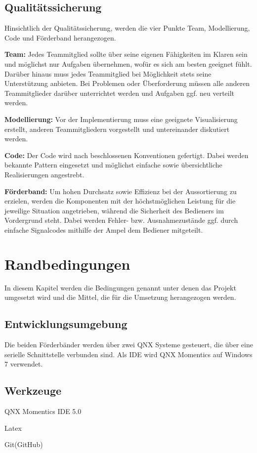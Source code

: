 \documentclass[a4paper, 11pt]{article}
\begin{document}
\subsection{Qualitätssicherung}
Hinsichtlich der Qualitätssicherung, werden die vier Punkte Team, Modellierung, Code und Förderband herangezogen.
\medskip
\begin{compactenum}[1.]
\item \textbf{Team:} Jedes Teammitglied sollte über seine eigenen Fähigkeiten im Klaren sein und möglichst nur Aufgaben übernehmen, wofür es sich am besten geeignet fühlt. Darüber hinaus muss jedes Teammitglied bei Möglichkeit stets seine Unterstützung anbieten. Bei Problemen oder Überforderung müssen alle anderen Teammitglieder darüber unterrichtet werden und Aufgaben ggf. neu verteilt werden.
\medskip
\item \textbf{Modellierung:} Vor der Implementierung muss eine geeignete Visualisierung erstellt, anderen Teammitgliedern vorgestellt und untereinander diskutiert werden. 
\medskip
\item \textbf{Code:} Der Code wird nach beschlossenen Konventionen gefertigt. Dabei werden bekannte Pattern eingesetzt und möglichst einfache sowie übersichtliche Realisierungen angestrebt.
\medskip
\item \textbf{Förderband:} Um hohen Durchsatz sowie Effizienz bei der Aussortierung zu erzielen, werden die Komponenten mit der höchstmöglichen Leistung für die jeweilige Situation angetrieben, während die Sicherheit des Bedieners im Vordergrund steht. Dabei werden Fehler- bzw. Ausnahmezustände ggf. durch einfache Signalcodes mithilfe der Ampel dem Bediener mitgeteilt.
\end{compactenum}

\section{Randbedingungen}
In diesem Kapitel werden die Bedingungen genannt unter denen das Projekt umgesetzt wird und die Mittel, die für die Umsetzung herangezogen werden.

\subsection{Entwicklungsumgebung}
Die beiden Förderbänder werden über zwei QNX Systeme gesteuert, die über eine serielle Schnittstelle verbunden sind. Als IDE wird QNX Momentics auf Windows 7 verwendet.

\subsection{Werkzeuge}
\begin{compactenum}[-]
\item QNX Momentics IDE 5.0
\item Latex
\item Git(GitHub)
\end{compactenum}
\end{document}
